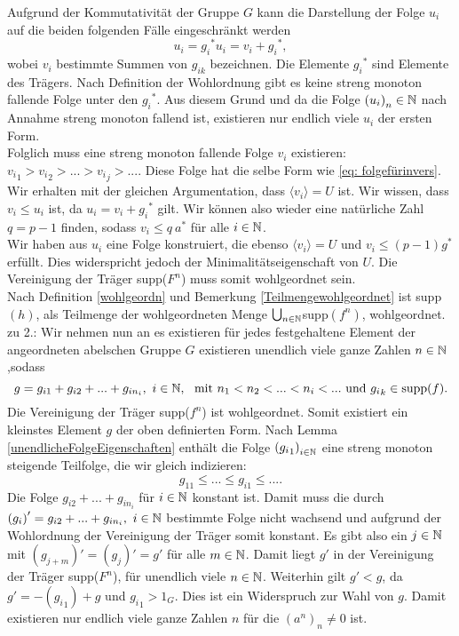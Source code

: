 {%
%
Aufgrund der Kommutativität der Gruppe $G$ kann die Darstellung der Folge $u_i$ auf die beiden folgenden Fälle eingeschränkt werden
%
%
%
%
% 
%
\[
u_i = {g_i}^*        u_i = v_i+{g_i}^*,
\]
wobei $v_i$ bestimmte Summen von $g_{ik}$ bezeichnen. 
Die Elemente ${g_i}^*$ sind Elemente des Trägers. Nach Definition der Wohlordnung gibt es keine streng monoton fallende Folge unter den ${g_i}^*$. Aus diesem Grund und da die Folge ${\left(u_i\right)}_n\in \mathbb{N}$ nach Annahme streng monoton fallend ist, existieren nur endlich viele $u_i$ der ersten Form. \\
Folglich muss eine streng monoton fallende Folge $v_i$ existieren: ${v_i}_1 > {v_i}_2 > ... > {v_i}_j > ...$. Diese Folge hat die selbe Form wie \ref{eq: folgefürinvers}. Wir erhalten mit der gleichen Argumentation, dass $\langle v_i\rangle = U$ ist. Wir wissen, dass $v_i \le u_i$ ist, da $u_i = v_i+{g_i}^*$ gilt. Wir können also wieder eine natürliche Zahl $q = p-1$ finden, sodass $v_i \le q~a^*$ für alle $i \in \mathbb{N}$. \\ 
Wir haben aus $u_i$ eine Folge konstruiert, die ebenso $\langle v_i\rangle = U$ und $v_i \leq \left(p-1\right)g^*$ erfüllt.
Dies widerspricht jedoch der Minimalitätseigenschaft von $U$. 
%
%
Die Vereinigung der Träger supp($F^n$) muss somit wohlgeordnet sein. \\
%
%
%
%
Nach Definition \ref{wohlgeordn} und Bemerkung \ref{Teilmengewohlgeordnet} ist supp$(h)$, als Teilmenge der wohlgeordneten Menge $\bigcup_{n\in\mathbb{N}}$supp$(f^n)$, wohlgeordnet.\\
%
%
%
%
%
%
zu 2.: Wir nehmen nun an es existieren für jedes festgehaltene Element der angeordneten abelschen Gruppe $G$ existieren unendlich viele ganze Zahlen $n \in \mathbb{N}$,sodass \[g = g_{i1} +g_{i2} + ... + g_{in_i},~ i \in \mathbb{N},~\text{ mit } n_1 < n_2 < ... < n_i < ...\text{ und } {g_i}_k \in \text{supp}(f).\]
Die Vereinigung der Träger supp($f^n$) ist wohlgeordnet. Somit existiert ein kleinstes Element $g$ der oben definierten Form. Nach Lemma \ref{unendlicheFolgeEigenschaften} enthält die Folge $\left({g_i}_1\right)_{i\in \mathbb{N}}$ eine streng monoton steigende Teilfolge, die wir gleich indizieren:
\[g_{11} \le ... \le g_{i1} \le ... . \] 
Die Folge $g_{i2} + ... + g_{in_i}$ für $i \in \mathbb{N}$ konstant ist. Damit muss die durch $\left(g_i\right)'  = g_{i2} + ... + g_{in_i},~ i \in \mathbb{N}$ bestimmte Folge nicht wachsend und aufgrund der Wohlordnung der Vereinigung der Träger somit konstant. Es gibt also ein $j \in \mathbb{N}$ mit $\left(g_{j+m}\right)' = \left(g_j\right)' = g'$ für alle $m \in \mathbb{N}$. Damit liegt $g'$ in der Vereinigung der Träger supp($F^n$), für unendlich viele $n\in \mathbb{N}$. Weiterhin gilt $g' < g$, da $g' = -\left({g_i}_1\right) + g$ und ${g_i}_1 >1_G$. Dies ist ein Widerspruch zur Wahl von $g$. Damit existieren nur endlich viele ganze Zahlen $n$ für die $\left(a^n\right)_n \neq 0$ ist.
}
